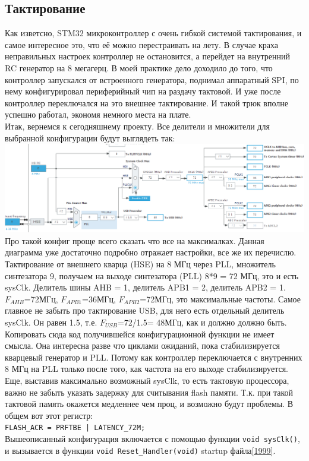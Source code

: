 \documentclass[12pt,a4paper]{article}
\begin{document}
\subsection{Тактирование}
    Как изветсно, STM32 микроконтроллер с очень гибкой системой тактирования,
    и самое интересное это, что её можно перестраивать на лету. В случае краха
    неправильных настроек контроллер не остановится, а перейдет на внутренний
    RC генератор на 8 мегагерц. В моей практике дело доходило до того, что
    контроллер запускался от встроенного генератора, поднимал аппаратный SPI,
    по нему конфигурировал периферийный чип на раздачу тактовой. И уже после
    контроллер переключался на это внешнее тактирование. И такой трюк вполне
    успешно работал, экономя немного места на плате.\\
    Итак, вернемся к
    сегодняшнему проекту. Все делители и множители для выбранной конфигурации
    будут выглядеть так:\\
\includegraphics[width=15cm]{tact.png}\\
    Про такой конфиг проще всего сказать что все на максималках. Данная
    диаграмма уже достаточно подробно отражает настройки, все же их перечислю.
    Тактирование от внешнего кварца (HSE) на 8 МГц через PLL, множитель синтезатора 9,
    получаем на выходе синтезатора (PLL) 8*9 = 72 МГц, это и есть sysClk.
    Делитель шины AHB = 1, делитель APB1 = 2, делитель APB2 = 1.
    $F_{AHB}$=72МГц, $F_{APB1}$=36МГц, $F_{APB2}$=72МГц, это максимальные частоты.
    Самое главное не забыть про тактирование USB, для него есть отдельный
    делитель sysClk. Он равен 1.5, т.е. $F_{USB}$=72/1.5= 48МГц, как и должно
    должно быть.\\
    Копировать сюда код получившейся конфигурационной функции не имеет смысла.
    Она интересна разве что циклами ожиданий, пока стабилизируется кварцевый
    генератор и PLL. Потому как контроллер переключается с внутренних 8 МГц на
    PLL только после того, как частота на его выходе стабилизируется.\\
    Еще, выставив максимально возможный sysClk, то есть тактовую процессора,
    важно не забыть указать задержку для считывания flash памяти. Т.к. при
    такой тактовой память окажется медленнее чем проц, и возможно будут
    проблемы. В общем вот этот регистр:\\
    \lstinline{FLASH_ACR = PRFTBE | LATENCY_72M;}\\
    Вышеописанный конфигурация включается  с помощью функции
    \lstinline{void sysClk()}, и вызывается в функции
    \lstinline{void Reset_Handler(void)} startup файла\ref{1999}.
\end{document}
